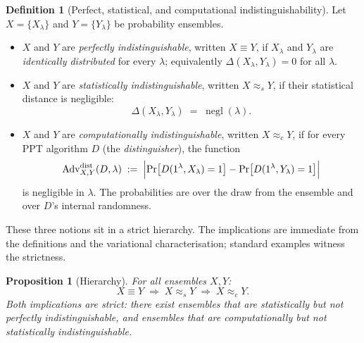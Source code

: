\documentclass[11pt,a4paper]{article}
\newtheorem{proposition}[theorem]{Proposition}
\theoremstyle{definition}
\newtheorem{definition}[theorem]{Definition}
\theoremstyle{remark}
\DeclareMathOperator{\negl}{negl}
\begin{document}
\begin{definition}[Perfect, statistical, and computational indistinguishability]\label{model:def:indist}
Let \(X = \{X_\lambda\}\) and \(Y = \{Y_\lambda\}\) be probability ensembles.
\begin{itemize}
\item \(X\) and \(Y\) are \emph{perfectly indistinguishable}, written
  \(X \equiv Y\), if \(X_\lambda\) and \(Y_\lambda\) are \emph{identically
  distributed} for every \(\lambda\); equivalently \(\Delta(X_\lambda,
  Y_\lambda) = 0\) for all \(\lambda\).
\item \(X\) and \(Y\) are \emph{statistically indistinguishable}, written
  \(X \approx_s Y\), if their statistical distance is negligible:
  \[
    \Delta(X_\lambda, Y_\lambda) \;=\; \negl(\lambda).
  \]
\item \(X\) and \(Y\) are \emph{computationally indistinguishable}, written
  \(X \approx_c Y\), if for every PPT algorithm \(D\) (the
  \emph{distinguisher}), the function
  \[
    \mathrm{Adv}^{\mathrm{dist}}_{X,Y}(D, \lambda)
    \;:=\; \Bigl| \Pr\bigl[D(1^\lambda, X_\lambda) = 1\bigr]
                 - \Pr\bigl[D(1^\lambda, Y_\lambda) = 1\bigr] \Bigr|
  \]
  is negligible in \(\lambda\). The probabilities are over the draw from the
  ensemble and over \(D\)'s internal randomness.
\end{itemize}
\end{definition}

These three notions sit in a strict hierarchy. The implications are immediate
from the definitions and the variational characterisation; standard examples
witness the strictness.

\begin{proposition}[Hierarchy]\label{model:prop:hierarchy}
For all ensembles \(X, Y\):
\[
  X \equiv Y \;\Longrightarrow\; X \approx_s Y
  \;\Longrightarrow\; X \approx_c Y .
\]
Both implications are strict: there exist ensembles that are statistically but
not perfectly indistinguishable, and ensembles that are computationally but not
statistically indistinguishable.
\end{proposition}
\end{document}
